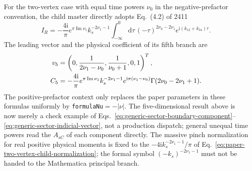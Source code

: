 \documentclass[11pt,a4paper]{article}
\newcommand{\dd}{\mathrm d}
\newcommand{\ii}{\mathrm i}
\begin{document}
For the two-vertex case with equal time powers $\nu_0$ in the negative-prefactor convention, the child master directly adopts Eq.~(4.2) of 2411
\begin{equation}
 I_R=-\frac{4\ii}{\pi}e^{\pi\operatorname{Im}\nu_1}k_s^{-2\nu_1-1}
 \int_{-\infty}^{0}\dd\tau\,(-\tau)^{2\nu_0-2\nu_1}
 e^{\ii(k_{12}+k_{34})\tau}.
 \label{eq:paper-two-vertex-child-normalization}
\end{equation}
The leading vector and the physical coefficient of its fifth branch are
\begin{align}
 v_5&=\left(0,\frac{1}{2\nu_1-\nu_0},\frac{1}{\nu_0+1},0,1\right)^T,
 \notag\\
 C_5&=-\frac{4\ii}{\pi}e^{\pi\operatorname{Im}\nu_1}
 k_s^{-2\nu_1-1}e^{\ii\pi(\nu_1-\nu_0)}
 \Gamma(2\nu_0-2\nu_1+1).
 \label{eq:paper-two-vertex-contact-boundary}
\end{align}
The positive-prefactor context only replaces the paper parameters in these formulas uniformly by \texttt{formulaNu}$=-|\nu|$. The five-dimensional result above is now merely a check example of Eqs.~\eqref{eq:generic-sector-boundary-component}--\eqref{eq:generic-sector-indicial-vector}, not a production dispatch; general unequal time powers read the $A_{sC}$ of each component directly. The massive pinch normalization for real positive physical momenta is fixed to the $-4\ii k_s^{-2\nu_1-1}/\pi$ of Eq.~\eqref{eq:paper-two-vertex-child-normalization}; the formal symbol $(-k_s)^{-2\nu_1-1}$ must not be handed to the Mathematica principal branch.
\end{document}

